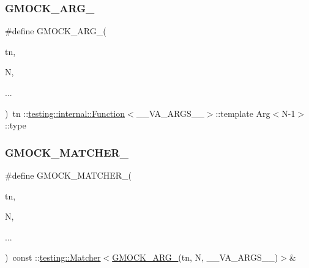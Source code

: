 \subsubsection{\texorpdfstring{GMOCK\_ARG\_}{GMOCK\_ARG\_}}
{\footnotesize\ttfamily \#define G\+M\+O\+C\+K\+\_\+\+A\+R\+G\+\_\+(\begin{DoxyParamCaption}\item[{}]{tn,  }\item[{}]{N,  }\item[{}]{... }\end{DoxyParamCaption})~tn \+::\mbox{\hyperlink{structtesting_1_1internal_1_1_function}{testing\+::internal\+::\+Function}}$<$\+\_\+\+\_\+\+V\+A\+\_\+\+A\+R\+G\+S\+\_\+\+\_\+$>$\+::template Arg$<$N-\/1$>$\+::type}

\mbox{\label{_obj__test_2lib_2googletest-master_2googlemock_2include_2gmock_2gmock-generated-function-mockers_8h_aa87d0009fe91f1c89d658776b55a769c}} 
\subsubsection{\texorpdfstring{GMOCK\_MATCHER\_}{GMOCK\_MATCHER\_}}
{\footnotesize\ttfamily \#define G\+M\+O\+C\+K\+\_\+\+M\+A\+T\+C\+H\+E\+R\+\_\+(\begin{DoxyParamCaption}\item[{}]{tn,  }\item[{}]{N,  }\item[{}]{... }\end{DoxyParamCaption})~const \+::\mbox{\hyperlink{classtesting_1_1_matcher}{testing\+::\+Matcher}}$<$\mbox{\hyperlink{_obj__test_2lib_2googletest-release-1_88_81_2googlemock_2include_2gmock_2gmock-generated-function-mockers_8h_a887575cc1c31158fba808180a10c004f}{G\+M\+O\+C\+K\+\_\+\+A\+R\+G\+\_\+}}(tn, N, \+\_\+\+\_\+\+V\+A\+\_\+\+A\+R\+G\+S\+\_\+\+\_\+)$>$\&}

\mbox{\label{_obj__test_2lib_2googletest-master_2googlemock_2include_2gmock_2gmock-generated-function-mockers_8h_ae0d290ffa58d7c624b2e3487ba1252f4}} 
